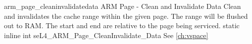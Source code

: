 %
%
%
%

\apidoc
{arm_page_cleaninvalidatedata}
{ARM Page - Clean and Invalidate Data}
{Clean and invalidates the cache range within the given page. The range will be flushed out to RAM. The start and end are relative to the page being serviced.}
{static inline int seL4\_ARM\_Page\_CleanInvalidate\_Data}
{
}
{\errorenumdesc}
{See \autoref{ch:vspace}}

